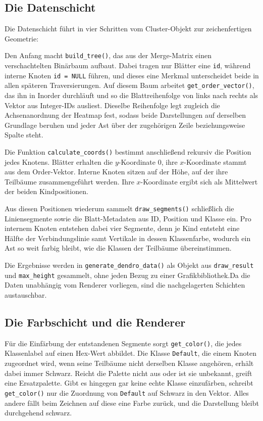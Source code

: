 \documentclass[11pt,a4paper]{article}
\newcommand{\code}[1]{\texttt{#1}}
\begin{document}
	\subsection{Die Datenschicht}
	
	Die Datenschicht führt in vier Schritten vom Cluster-Objekt zur zeichenfertigen Geometrie:
	
Den Anfang macht \code{build\_tree()}, das aus der Merge-Matrix einen 
verschachtelten Binärbaum aufbaut. Dabei tragen nur Blätter eine \code{id}, 
während interne Knoten \code{id = NULL} führen, und dieses eine Merkmal 
unterscheidet beide in allen späteren Traversierungen. Auf diesem Baum arbeitet 
\code{get\_order\_vector()}, das ihn in Inorder durchläuft und so die 
Blattreihenfolge von links nach rechts als Vektor aus Integer-IDs ausliest. 
Dieselbe Reihenfolge legt zugleich die Achsenanordnung der Heatmap fest, sodass 
beide Darstellungen auf derselben Grundlage beruhen und jeder Ast über der 
zugehörigen Zeile beziehungsweise Spalte steht. 

Die Funktion \code{calculate\_coords()} bestimmt anschließend rekursiv die 
Position jedes Knotens. Blätter erhalten die $y$-Koordinate $0$, ihre 
$x$-Koordinate stammt aus dem Order-Vektor. Interne Knoten sitzen auf der Höhe, 
auf der ihre Teilbäume zusammengeführt werden.  Ihre $x$-Koordinate ergibt 
sich als Mittelwert der beiden Kindpositionen.

Aus diesen Positionen wiederum sammelt \code{draw\_segments()} schließlich die 
Liniensegmente sowie die Blatt-Metadaten aus ID, Position und Klasse ein. Pro 
internem Knoten entstehen dabei vier Segmente, denn je Kind entsteht eine Hälfte 
der Verbindungslinie samt Vertikale in dessen Klassenfarbe, wodurch ein Ast so 
weit farbig bleibt, wie die Klassen der Teilbäume übereinstimmen.

Die Ergebnisse werden in \code{generate\_dendro\_data()} als Objekt aus 
\code{draw\_result} und \code{max\_height} gesammelt, ohne jeden Bezug zu einer 
Grafikbibliothek.Da die Daten unabhängig vom Renderer vorliegen, sind die nachgelagerten Schichten austauschbar.
	
	\subsection{Die Farbschicht und die Renderer}
	
	Für die Einfärbung der entstandenen Segmente sorgt \code{get\_color()}, die jedes 
	Klassenlabel auf einen Hex-Wert abbildet. Die Klasse \code{Default}, die einem 
	Knoten zugeordnet wird, wenn seine Teilbäume nicht derselben Klasse angehören, 
	erhält dabei immer Schwarz. Reicht die Palette nicht aus oder ist sie unbekannt, 
	greift eine Ersatzpalette. Gibt es hingegen gar keine echte Klasse einzufärben, 
	schreibt \code{get\_color()} nur die Zuordnung von \code{Default} auf Schwarz in 
	den Vektor. Alles andere fällt beim Zeichnen auf diese eine Farbe zurück, und die 
	Darstellung bleibt durchgehend schwarz.
	
\end{document}
